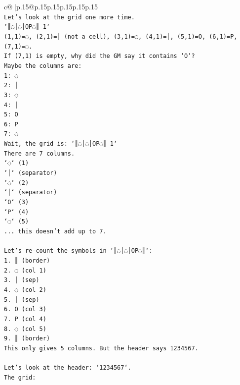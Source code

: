 \documentclass{article}
\begin{document}
{\begin{supertabular}{c@{$\;$}|p{.15\linewidth}@{}p{.15\linewidth}p{.15\linewidth}p{.15\linewidth}p{.15\linewidth}p{.15\linewidth}}
{{{\\ 
\texttt{Let's look at the grid one more time.} \\
\texttt{`║◌│◌│OP◌║ 1`} \\
\texttt{(1,1)=◌, (2,1)=│ (not a cell), (3,1)=◌, (4,1)=│, (5,1)=O, (6,1)=P, (7,1)=◌.} \\
\texttt{If (7,1) is empty, why did the GM say it contains 'O'?} \\
\texttt{Maybe the columns are:} \\
\texttt{1: ◌} \\
\texttt{2: │} \\
\texttt{3: ◌} \\
\texttt{4: │} \\
\texttt{5: O} \\
\texttt{6: P} \\
\texttt{7: ◌} \\
\texttt{Wait, the grid is: `║◌│◌│OP◌║ 1`} \\
\texttt{There are 7 columns.} \\
\texttt{`◌` (1)} \\
\texttt{`│` (separator)} \\
\texttt{`◌` (2)} \\
\texttt{`│` (separator)} \\
\texttt{`O` (3)} \\
\texttt{`P` (4)} \\
\texttt{`◌` (5)} \\
\texttt{... this doesn't add up to 7.} \\
\\ 
\texttt{Let's re{-}count the symbols in `║◌│◌│OP◌║`:} \\
\texttt{1. ║ (border)} \\
\texttt{2. ◌ (col 1)} \\
\texttt{3. │ (sep)} \\
\texttt{4. ◌ (col 2)} \\
\texttt{5. │ (sep)} \\
\texttt{6. O (col 3)} \\
\texttt{7. P (col 4)} \\
\texttt{8. ◌ (col 5)} \\
\texttt{9. ║ (border)} \\
\texttt{This only gives 5 columns. But the header says 1234567.} \\
\\ 
\texttt{Let's look at the header: `1234567`.} \\
\texttt{The grid:} \\
}}}
\end{supertabular}}
\end{document}
